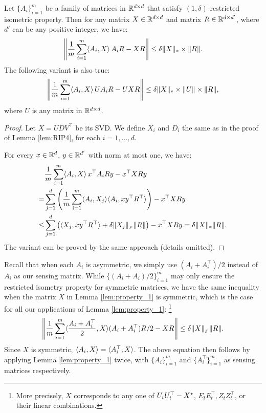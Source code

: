 \begin{lem}\label{lem:property_2}
	Let $\{A_i\}_{i=1}^m$ be a family of matrices in $\mathbb{R}^{d \times d}$
	that satisfy $(1, \delta)$-restricted isometric property.
	Then for any matrix $X \in \mathbb{R}^{d \times d}$ and matrix $R \in \mathbb{R}^{d \times d'}$, where $d'$ can be any positive integer,
	we have:
	\[\left\| \frac{1}{m}\sum_{i = 1}^m \langle A_i, X\rangle\, A_i R - X R\right\| \leq
	\delta \|X\|_{*} \times \|R\|. \]
	The following variant is also true:
	\[ \left\|\frac 1 m \sum_{i=1}^m \langle A_i, X\rangle\, U A_i R - U X R\right\| \le
	\delta \|X\|_{*} \times \|U\| \times \|R\|, \]
 	where $U$ is any matrix in $\mathbb{R}^{d \times d}$.
\end{lem}

\begin{proof}
	Let $X = U D V^{\top}$ be its SVD.
	We define $X_i$ and $D_i$ the same as in the proof of Lemma \ref{lem:RIP4},
	for each $i=1,\dots,d$.
	
	For every $x \in \mathbb{R}^d$, $y \in \mathbb{R}^{d'}$ with norm at most one, we have:
	\begin{align*}
		&\frac 1 m \sum_{i=1}^m \langle A_i, X\rangle\, x^{\top} A_i R y
			- x^{\top}{X}{R} y \\
		=& \sum_{j=1}^d \left( \frac 1 m \sum_{i=1}^m \langle{A}_i, {X}_j\rangle \langle{A}_i, x y^{\top}{R}^{\top}\rangle \right)
			- x^{\top}{X}{R} y \\
		\le& \sum_{j=1}^d \left( \langle{X}_j, x y^{\top}{R}^{\top}\rangle + \delta \|{X}_j\|_{_{F}}\|{R}\| \right)
			- x^{\top}{X}{R} y
		= \delta \|{X}\|_{*}\|{R}\|.
	\end{align*}
	The variant can be proved by the same approach (details omitted).
\end{proof}

Recall that when each $A_i$ is asymmetric, we simply use $(A_i + A_i^{\top}) / 2$ instead of $A_i$ as our sensing matrix.
While $\{(A_i + A_i) / 2\}_{i=1}^m$ may only ensure the restricted isometry property for symmetric matrices,
we have the same inequality when the matrix $X$ in Lemma \ref{lem:property_1} is symmetric, which is the case for all our applications of Lemma \ref{lem:property_1}:
\footnote{More precisely, $X$ corresponds to any one of $U_tU_t^{\top} - {X}^\star$, $E_tE_t^{\top}, Z_tZ_t^{\top}$, or their linear combinations.}
\begin{align*}
	\left\|\frac 1 m \sum_{i=1}^m \langle\frac {A_i + A_i^{\top}} 2, X\rangle (A_i + A_i^{\top}) R / 2 - XR\right\| \le \delta \|X\|_{_{F}} \|R\|.
\end{align*}
Since $X$ is symmetric, $\langle A_i, X\rangle = \langle A_i^{\top}, X\rangle$.
The above equation then follows by applying Lemma \ref{lem:property_1} twice,
with $\{A_i\}_{i=1}^m$ and $\{A_i^{\top}\}_{i=1}^m$ as sensing matrices respectively.

